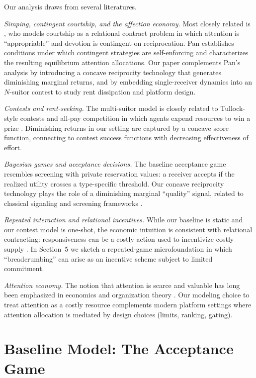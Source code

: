 \documentclass[AER]{AEA}
\begin{document}
Our analysis draws from several literatures.

\textit{Simping, contingent courtship, and the affection economy.} Most closely related is
\citet{Price2026}, who models courtship as a relational contract problem in which attention
is ``appropriable'' and devotion is contingent on reciprocation. Pan establishes conditions
under which contingent strategies are self-enforcing and characterizes the resulting
equilibrium attention allocations. Our paper complements Pan's analysis by introducing a
concave reciprocity technology that generates diminishing marginal returns, and by
embedding single-receiver dynamics into an $N$-suitor contest to study rent dissipation
and platform design.

\textit{Contests and rent-seeking.} The multi-suitor model is closely related to
Tullock-style contests and all-pay competition in which agents expend resources to win a
prize \citep{Tullock1980, Konrad2009}. Diminishing returns in our setting are captured by
a concave score function, connecting to contest success functions with decreasing
effectiveness of effort.

\textit{Bayesian games and acceptance decisions.} The baseline acceptance game resembles
screening with private reservation values: a receiver accepts if the realized utility
crosses a type-specific threshold. Our concave reciprocity technology plays the role of a
diminishing marginal ``quality'' signal, related to classical signaling and screening
frameworks \citep{Spence1973, Riley2001}.

\textit{Repeated interaction and relational incentives.} While our baseline is static and
our contest model is one-shot, the economic intuition is consistent with relational
contracting: responsiveness can be a costly action used to incentivize costly supply
\citep{BakerGibbonsMurphy2002, Levin2003}. In Section~5 we sketch a repeated-game
microfoundation in which ``breadcrumbing'' can arise as an incentive scheme subject to
limited commitment.

\textit{Attention economy.} The notion that attention is scarce and valuable has long been
emphasized in economics and organization theory \citep{Simon1971}. Our modeling choice to
treat attention as a costly resource complements modern platform settings where attention
allocation is mediated by design choices (limits, ranking, gating).

\section{Baseline Model: The Acceptance Game}
\end{document}
